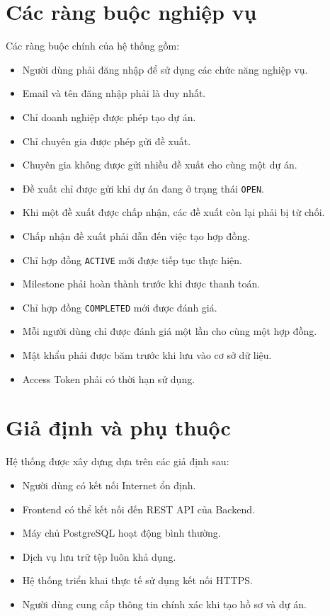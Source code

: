 
\section{Các ràng buộc nghiệp vụ}

Các ràng buộc chính của hệ thống gồm:

\begin{itemize}
    \item Người dùng phải đăng nhập để sử dụng các chức năng nghiệp vụ.
    \item Email và tên đăng nhập phải là duy nhất.
    \item Chỉ doanh nghiệp được phép tạo dự án.
    \item Chỉ chuyên gia được phép gửi đề xuất.
    \item Chuyên gia không được gửi nhiều đề xuất cho cùng một dự án.
    \item Đề xuất chỉ được gửi khi dự án đang ở trạng thái \texttt{OPEN}.
    \item Khi một đề xuất được chấp nhận, các đề xuất còn lại phải bị từ chối.
    \item Chấp nhận đề xuất phải dẫn đến việc tạo hợp đồng.
    \item Chỉ hợp đồng \texttt{ACTIVE} mới được tiếp tục thực hiện.
    \item Milestone phải hoàn thành trước khi được thanh toán.
    \item Chỉ hợp đồng \texttt{COMPLETED} mới được đánh giá.
    \item Mỗi người dùng chỉ được đánh giá một lần cho cùng một hợp đồng.
    \item Mật khẩu phải được băm trước khi lưu vào cơ sở dữ liệu.
    \item Access Token phải có thời hạn sử dụng.
\end{itemize}


\section{Giả định và phụ thuộc}

Hệ thống được xây dựng dựa trên các giả định sau:

\begin{itemize}
    \item Người dùng có kết nối Internet ổn định.
    \item Frontend có thể kết nối đến REST API của Backend.
    \item Máy chủ PostgreSQL hoạt động bình thường.
    \item Dịch vụ lưu trữ tệp luôn khả dụng.
    \item Hệ thống triển khai thực tế sử dụng kết nối HTTPS.
    \item Người dùng cung cấp thông tin chính xác khi tạo hồ sơ và dự án.
\end{itemize}